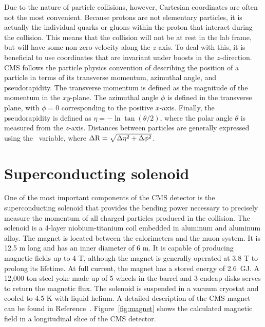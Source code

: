 Due to the nature of particle collisions, however, Cartesian coordinates are often not the most convenient. Because protons are not elementary particles, it is actually the individual quarks or gluons within the proton that interact during the collision. This means that the collision will not be at rest in the lab frame, but will have some non-zero velocity along the $z$-axis. To deal with this, it is beneficial to use coordinates that are invariant under boosts in the $z$-direction. CMS follows the particle physics convention of describing the position of a particle in terms of its transverse momentum, azimuthal angle, and pseudorapidity. The transverse momentum \pt is defined as the magnitude of the momentum in the $xy$-plane. The azimuthal angle $\phi$ is defined in the transverse plane, with $\phi  = 0$ corresponding to the positive $x$-axis. Finally, the pseudorapidity is defined as $\eta = -\ln{\tan{ (\theta / 2 )} } $, where the polar angle $\theta$ is measured from the $z$-axis. Distances between particles are generally expressed using the \dR~variable, where $\Delta\mathrm{R} = \sqrt{\Delta \eta^2 + \Delta \phi^2}$.


\section{Superconducting solenoid}
\label{sec:magnet}

One of the most important components of the CMS detector is the superconducting solenoid that provides the bending power necessary to precisely measure the momentum of all charged particles produced in the collision. The solenoid is a 4-layer niobium-titanium coil embedded in aluminum and aluminum alloy. The magnet is located between the calorimeters and the muon system. It is 12.5 m long and has an inner diameter of 6 m. It is capable of producing magnetic fields up to 4 T, although the magnet is generally operated at 3.8 T to prolong its lifetime. At full current, the magnet has a stored energy of 2.6~GJ. A 12,000 ton steel yoke made up of 5 wheels in the barrel and 3 endcap disks serves to return the magnetic flux. The solenoid is suspended in a vacuum cryostat and cooled to 4.5 K with liquid helium. A detailed description of the CMS magnet can be found in Reference~\cite{magnetTDR}. Figure~\ref{fig:magnet} shows the calculated magnetic field in a longitudinal slice of the CMS detector.


